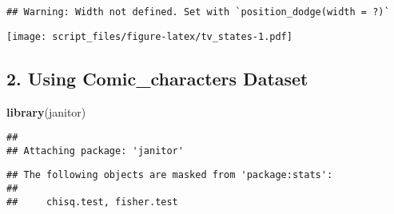 \documentclass[
]{article}
\newenvironment{Shaded}{\begin{snugshade}}{\end{snugshade}}
\newcommand{\KeywordTok}[1]{\textcolor[rgb]{0.13,0.29,0.53}{\textbf{#1}}}
\newcommand{\NormalTok}[1]{#1}
\begin{document}
\begin{verbatim}
## Warning: Width not defined. Set with `position_dodge(width = ?)`
\end{verbatim}

\texttt{[image: script\_files/figure-latex/tv\_states-1.pdf]}

\hypertarget{using-comic_characters-dataset}{%
\subsection{2. Using Comic\_characters
Dataset}\label{using-comic_characters-dataset}}

\begin{Shaded}
\begin{Highlighting}[]
\KeywordTok{library}\NormalTok{(janitor)}
\end{Highlighting}
\end{Shaded}

\begin{verbatim}
## 
## Attaching package: 'janitor'
\end{verbatim}

\begin{verbatim}
## The following objects are masked from 'package:stats':
## 
##     chisq.test, fisher.test
\end{verbatim}
\end{document}
